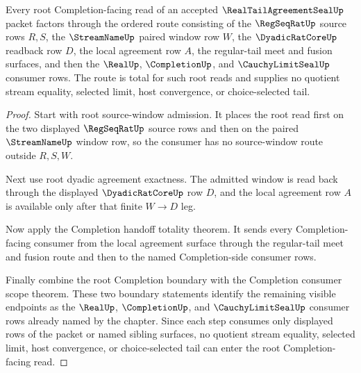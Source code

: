 \begin{theorem}
\label{thm:real-tail-agreement-seal-root-completion-window-totality}
Every root Completion-facing read of an accepted $\RealTailAgreementSealUp$ packet factors through the ordered route consisting of the $\RegSeqRatUp$ source rows $R,S$, the $\StreamNameUp$ paired window row $W$, the $\DyadicRatCoreUp$ readback row $D$, the local agreement row $A$, the regular-tail meet and fusion surfaces, and then the $\RealUp$, $\CompletionUp$, and $\CauchyLimitSealUp$ consumer rows. The route is total for such root reads and supplies no quotient stream equality, selected limit, host convergence, or choice-selected tail.
\end{theorem}
\begin{proof}
Start with root source-window admission. It places the root read first on the two displayed $\RegSeqRatUp$ source rows and then on the paired $\StreamNameUp$ window row, so the consumer has no source-window route outside $R,S,W$.

Next use root dyadic agreement exactness. The admitted window is read back through the displayed $\DyadicRatCoreUp$ row $D$, and the local agreement row $A$ is available only after that finite $W \to D$ leg.

Now apply the Completion handoff totality theorem. It sends every Completion-facing consumer from the local agreement surface through the regular-tail meet and fusion route and then to the named Completion-side consumer rows.

Finally combine the root Completion boundary with the Completion consumer scope theorem. These two boundary statements identify the remaining visible endpoints as the $\RealUp$, $\CompletionUp$, and $\CauchyLimitSealUp$ consumer rows already named by the chapter. Since each step consumes only displayed rows of the packet or named sibling surfaces, no quotient stream equality, selected limit, host convergence, or choice-selected tail can enter the root Completion-facing read.
\end{proof}
